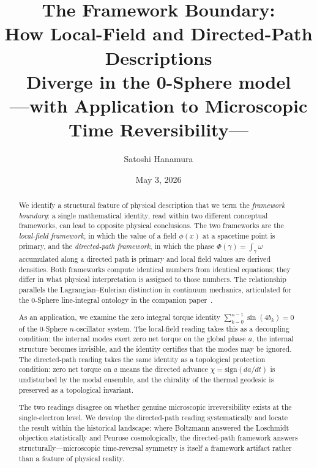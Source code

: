 \documentclass[%
 reprint, amsmath,amssymb, aps, prb, ]{revtex4-2}
\numberwithin{equation}{section}
\begin{document}
\title{
The Framework Boundary:\\
How Local-Field and Directed-Path Descriptions\\
Diverge in the 0-Sphere model\\
{\normalsize ---with Application to Microscopic Time Reversibility---}
}

\author{Satoshi Hanamura}
\date{May 3, 2026}

\begin{abstract}
We identify a structural feature of physical description that we term the \emph{framework boundary}: a single mathematical identity, read within two different conceptual frameworks, can lead to opposite physical conclusions. The two frameworks are the \emph{local-field framework}, in which the value of a field $\phi(x)$ at a spacetime point is primary, and the \emph{directed-path framework}, in which the phase $\Phi(\gamma) = \int_\gamma\omega$ accumulated along a directed path is primary and local field values are derived densities. Both frameworks compute identical numbers from identical equations; they differ in what physical interpretation is assigned to those numbers. The relationship parallels the Lagrangian--Eulerian distinction in continuum mechanics, articulated for the 0-Sphere line-integral ontology in the companion paper~\cite{hanamura55}.

As an application, we examine the zero integral torque identity $\sum_{k=0}^{n-1}\sin(4b_k)=0$ of the 0-Sphere $n$-oscillator system. The local-field reading takes this as a decoupling condition: the internal modes exert zero net torque on the global phase $a$, the internal structure becomes invisible, and the identity certifies that the modes may be ignored. The directed-path reading takes the same identity as a topological protection condition: zero net torque on $a$ means the directed advance $\chi=\mathrm{sign}(da/dt)$ is undisturbed by the modal ensemble, and the chirality of the thermal geodesic is preserved as a topological invariant.

The two readings disagree on whether genuine microscopic irreversibility exists at the single-electron level. We develop the directed-path reading systematically and locate the result within the historical landscape: where Boltzmann answered the Loschmidt objection statistically and Penrose cosmologically, the directed-path framework answers structurally---microscopic time-reversal symmetry is itself a framework artifact rather than a feature of physical reality.
\end{abstract}
\end{document}
